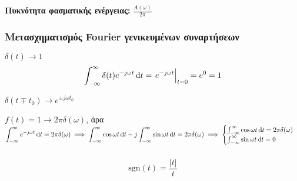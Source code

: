      \begin{defn*}{}
        \textbf{Πυκνότητα φασματικής ενέργειας:}
        \(\displaystyle
        \frac{A(\omega)}{2\pi}
        \)
     \end{defn*}
     
     \subsubsection{Μετασχηματισμός Fourier γενικευμένων συναρτήσεων}
     \begin{enumgreekpar}
        \item\( \delta(t) \to 1 \)
        \[
        \int_{-\infty}^{\infty} \delta(t)e^{-j\omega t}\dif t=
        \left.e^{-j\omega t}\right|_{t=0}=e^0=1
        \]
        
        \( \delta(t\mp t_0) \to e^{\pm j\omega t_0} \)
        
        \( f(t) =1\to 2\pi\delta(\omega ) \), άρα
        \( \displaystyle \int_{-\infty}^{\infty}e^{-j\omega t }\dif t
        =2\pi\delta(\omega ) \implies \int_{-\infty}^{\infty} \cos\omega t \dif t
        -j\int_{-\infty}^{\infty}\sin\omega t\dif t = 2\pi\delta(\omega )\implies
        \begin{cases}
        \int_{-\infty}^{\infty} \cos\omega t\dif t = 2\pi\delta(\omega ) \\
        \int_{-\infty}^{\infty} \sin\omega t\dif t = 0
        \end{cases}
         \)
        
        
     \end{enumgreekpar}
     
     \subsubsection{}
     \[
     \mathrm{sgn}(t) = \frac{|t|}{t}
     \]
     

